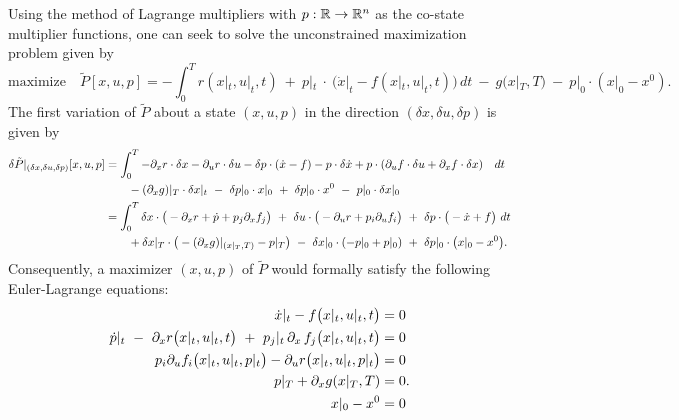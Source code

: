 \documentclass[11pt]{article}
\begin{document}
Using the method of Lagrange multipliers with $p:\mathbb R \to \mathbb R^n$ as the co-state multiplier functions, one can seek to solve the unconstrained maximization problem given by
\begin{equation*}
    \mbox{maximize} \quad \tilde{P}[x,u,p] = - \int_0^T r\left(x|_t,u|_t,t \right) \ + \ p|_t \ \cdot \ \big(\dot{x}|_t - f(x|_t,u|_t,t) \big) \, dt \ - \ g(x|_T, T) \ - \ p|_0 \cdot (x|_0 - x^0).
\end{equation*}
The first variation of $\tilde{P}$ about a state $(x,u,p)$ in the direction $(\delta x, \delta u, \delta p)$ is given by
\begin{subequations}
\allowdisplaybreaks
\begin{align}
    \delta \tilde{P}|_{(\delta x, \delta u, \delta p)}[x,u,p] & = \int_0^T - \p_x r \cdot \delta x - \p_u r \cdot \delta u - \delta p \cdot (\dot{x} - f) - p \cdot \delta \dot{x} + p \cdot (\p_u f \cdot \delta u + \p_x f \cdot \delta x) \quad dt \notag\\
    & \qquad - (\p_x g)|_T \cdot \delta x|_t \ - \ \delta p|_0 \cdot x|_0  \ +  \ \delta p|_0 \cdot x^0 \ - \ p|_0 \cdot \delta x|_0 \notag\\
    & = \int_0^T \delta x \cdot \big(  - \p_x r + \dot{p} + p_j \p_x f_j \big) \ + \ \delta u \cdot \big(  - \p_u r + p_i \p_u f_i \big) \ + \ \delta p \cdot \big( - \dot{x} + f \big) \ dt   \notag\\
    & \qquad + \delta x|_T \cdot \big( - (\p_x g)|_{(x|_T,T)} - p|_T \big) \  - \ \delta x|_0 \cdot (-p|_0 + p|_0) \ + \ \delta p|_0 \cdot \big( x|_0 - x^0 \big). \notag
\end{align}
\end{subequations}
Consequently, a maximizer $(x,u,p)$ of $\tilde{P}$ would formally satisfy the following Euler-Lagrange equations:
\begin{subequations}\label{eq:control_EL}
\allowdisplaybreaks
    \begin{align}
        \dot{x}|_t - f\big(x|_t,u|_t, t\big) & = 0 \label{eq:x_evol}\\
        \dot{p}|_t \ -  \ \p_x r\big(x|_t,u|_t,t \big) \ + \ p_j|_t \, \p_x \, f_j \big(x|_t,u|_t,t\big) & = 0 \label{eq:p_evol}\\ 
        p_i \p_u f_i \big(x|_t,u|_t,p|_t\big) - \p_u r \big(x|_t,u|_t,p|_t \big) & = 0 \label{eq:H_crit}\\
        p|_T + \p_x g(x|_T,T) & = 0. \label{eq:p_bc}\\
        x|_0 -  x^0 & = 0 \label{eq:x_bc}
    \end{align}   
\end{subequations}
\end{document}
